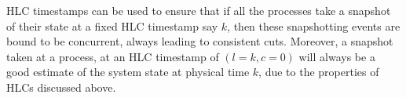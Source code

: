 \documentclass{article}
\begin{document}
    HLC timestamps can be used to ensure that if all the processes take a snapshot of their state at a fixed HLC timestamp say $k$, then these snapshotting events are bound to be concurrent, always leading to consistent cuts. Moreover, a snapshot taken at a process, at an HLC timestamp of $(l=k,c=0)$ will always be a good estimate of the system state at physical time $k$, due to the properties of HLCs discussed above.




\end{document}
